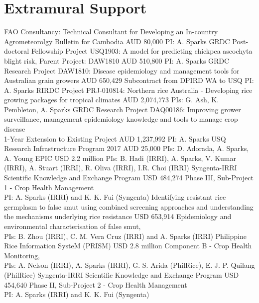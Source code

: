 \section*{Extramural Support}
  \begin{entrylist}
            {FAO Consultancy: Technical Consultant for Developing an In-country Agrometeorolgy Bulletin for Cambodia}
            {AUD 80,000}
            {PI: A. Sparks}
			{GRDC Post-doctoral Fellowship Project USQ1903: A model for predicting chickpea ascochyta blight risk, Parent Project: DAW1810}
			{AUD 510,800}
			{PI: A. Sparks}
			{GRDC Research Project DAW1810: Disease epidemiology and management tools for Australian grain growers}
			{AUD 650,429}
			{Subcontract from DPIRD WA to USQ PI: A. Sparks}
			{RIRDC Project PRJ-010814: Northern rice Australia - Developing rice growing packages for tropical climates}
			{AUD 2,074,773}
			{PIs: G. Ash, K. Pembleton, A. Sparks}
			{GRDC Research Project DAQ00186: Improving grower surveillance, management epidemiology knowledge and tools to manage crop disease\\1-Year Extension to Existing Project}
			{AUD 1,237,992}
			{PI: A. Sparks}
            {USQ Research Infrastructure Program 2017}
            {AUD 25,000}
            {PIs: D. Adorada, A. Sparks, A. Young}
            {EPIC }
            {USD 2.2 million}
            {PIs: B. Hadi (IRRI), A. Sparks, V. Kumar (IRRI), A. Stuart (IRRI), R. Oliva (IRRI), I.R. Choi (IRRI)}
	        {Syngenta-IRRI Scientific Knowledge and Exchange Program}
	        {USD 484,274}
	        {Phase III, Sub-Project 1 - Crop Health Management\\PI: A. Sparks (IRRI) and K. K. Fui (Syngenta)}
            {Identifying resistant rice germplasm to false smut using combined screening approaches and understanding the mechanisms underlying rice resistance}
            {USD 653,914}
            {Epidemiology and environmental characterisation of false smut,\\PIs: B. Zhou (IRRI), C. M. {Vera Cruz} (IRRI) and A. Sparks (IRRI)}
            {Philippine Rice Information SysteM (PRISM)}
	        {USD 2.8 million}
	        {Component B - Crop Health Monitoring,\\PIs: A. Nelson (IRRI), A. Sparks (IRRI), G. S. Arida (PhilRice), E. J. P. Quilang (PhilRice)}
	        {Syngenta-IRRI Scientific Knowledge and Exchange Program}
	        {USD 454,640}
	        {Phase II, Sub-Project 2 - Crop Health Management\\PI: A. Sparks (IRRI) and K. K. Fui (Syngenta)}
  \end{entrylist}

